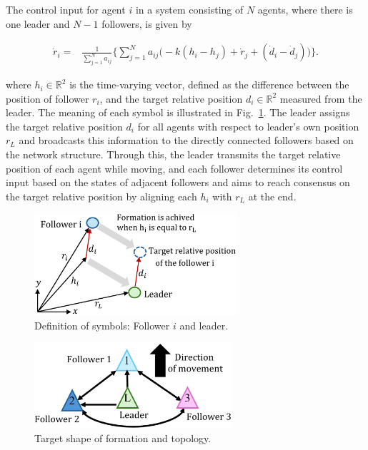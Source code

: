 \documentclass[a4paper,fleqn,10pt,twocolumn]{SICE_ISCS}
\newcommand{\Figref}[1]{{Fig.~\ref{#1}}}
\begin{document}
The control input for agent $i$ in a system consisting of $N$ agents, where there is one leader and $N-1$ followers, is given by

\begin{small}
\begin{align}
	\label{kuriki_consensus}
	\dot{r}_i=&\frac{1}{\sum_{j=1}^{N}a_{ij}}
	\bigg\{\sum_{j=1}^{N}a_{ij}\big(-k(h_i - h_j)+\dot{r}_j+(\dot{d}_i-\dot{d}_j)\big)\bigg\}.
\end{align}
\end{small}

\noindent where $h_i \in {\mathbb{R}}^2$ is the time-varying vector, defined as the difference between the position of follower $r_i$, and the target relative position $d_i \in {\mathbb{R}}^2$ measured from the leader. The meaning of each symbol is illustrated in \Figref{DefinitionofSymbols(L-F)}. The leader assigns the target relative position $d_i$ for all agents with respect to leader's own position $r_L$ and broadcasts this information to the directly connected followers based on the network structure. Through this, the leader transmits the target relative position of each agent while moving, and each follower determines its control input based on the states of adjacent followers and aims to reach consensus on the target relative position by aligning each $h_i$ with $r_L$ at the end. 

\begin{figure}[b]
	\begin{center}
		\includegraphics[width=75mm]{Fig/DefSymbol_(L-F).eps}
		\caption{Definition of symbols: Follower $i$ and leader.}
		\label{DefinitionofSymbols(L-F)}
	\end{center}
	\vspace{-1mm}
\end{figure}

\begin{figure}[b]
	\begin{center}
		\includegraphics[clip,width=73mm]{Fig/Topology.eps}
		\caption{Target shape of formation and topology.}
		\label{Topology}
	\end{center}
\end{figure}
\end{document}
